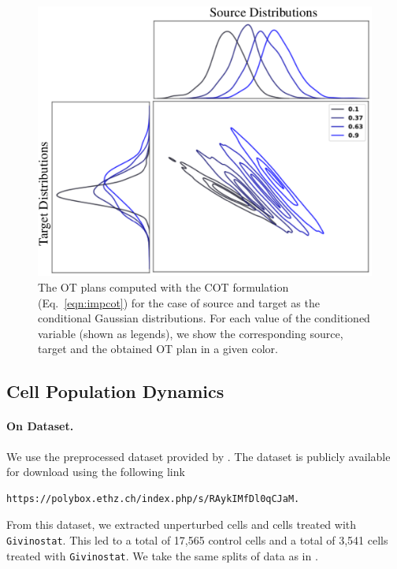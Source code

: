 \begin{figure}[t]
    \centering
    \includegraphics[scale=0.3]{chapter-3/images/plan_plot.pdf}
    \caption{The OT plans computed with the COT formulation (Eq.~\ref{eqn:impcot}) for the case of source and target as the conditional Gaussian distributions. For each value of the conditioned variable (shown as legends), we show the corresponding source, target and the obtained OT plan in a given color.}
    \label{fig:plan}
\end{figure}

\subsection{Cell Population Dynamics}
\paragraph{On Dataset.} We use the preprocessed dataset provided by \cite{cellot}. The dataset is publicly available for download using the following link \begin{verbatim}https://polybox.ethz.ch/index.php/s/RAykIMfDl0qCJaM.\end{verbatim} From this dataset, we extracted unperturbed cells and cells treated with \texttt{Givinostat}. This led to a total of 17,565 control cells and a total of 3,541 cells treated with \texttt{Givinostat}.  We take the same splits of data as in \cite{cellot}.

